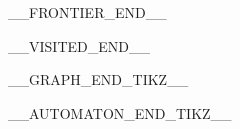 \noindent\begin{minipage}[t]{0.24\textwidth}
\begingroup
\setlength{\textwidth}{\linewidth}
\begin{center}
__FRONTIER_END__
\end{center}
\endgroup
\end{minipage}\hfill%
\noindent\begin{minipage}[t]{0.24\textwidth}
\begingroup
\setlength{\textwidth}{\linewidth}
\begin{center}
__VISITED_END__
\end{center}
\endgroup
\end{minipage}\hfill%
\noindent\begin{minipage}[t]{0.24\textwidth}
__GRAPH_END_TIKZ__
\end{minipage}\hfill%
\noindent\begin{minipage}[t]{0.24\textwidth}
__AUTOMATON_END_TIKZ__
\end{minipage}
